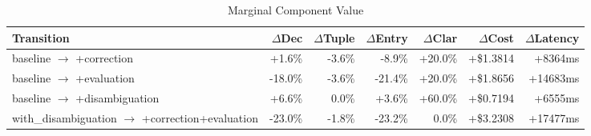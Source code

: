 \begin{table}[htbp]
\centering
\caption{Marginal Component Value}
\label{tab:marginal-deltas}
\begin{tabular}{l rrrr rr}
\toprule
Transition & $\Delta$Dec & $\Delta$Tuple & $\Delta$Entry & $\Delta$Clar & $\Delta$Cost & $\Delta$Latency \\
\midrule
  baseline $\to$ +correction & +1.6\% & -3.6\% & -8.9\% & +20.0\% & +\$1.3814 & +8364ms \\
  baseline $\to$ +evaluation & -18.0\% & -3.6\% & -21.4\% & +20.0\% & +\$1.8656 & +14683ms \\
  baseline $\to$ +disambiguation & +6.6\% & 0.0\% & +3.6\% & +60.0\% & +\$0.7194 & +6555ms \\
  with\_disambiguation $\to$ +correction+evaluation & -23.0\% & -1.8\% & -23.2\% & 0.0\% & +\$3.2308 & +17477ms \\
\bottomrule
\end{tabular}
\end{table}

